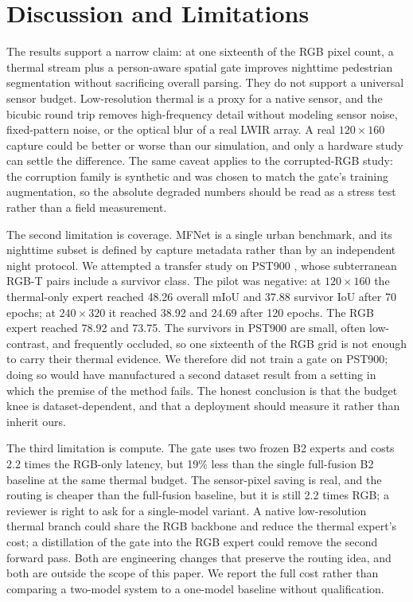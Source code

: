 \section{Discussion and Limitations}
\label{sec:discussion}

The results support a narrow claim: at one sixteenth of the RGB pixel count, a thermal
stream plus a person-aware spatial gate improves nighttime pedestrian segmentation
without sacrificing overall parsing. They do not support a universal sensor budget.
Low-resolution thermal is a proxy for a native sensor, and the bicubic round trip
removes high-frequency detail without modeling sensor noise, fixed-pattern noise, or
the optical blur of a real LWIR array. A real $120\times160$ capture could be better or
worse than our simulation, and only a hardware study can settle the difference. The
same caveat applies to the corrupted-RGB study: the corruption family is synthetic and
was chosen to match the gate's training augmentation, so the absolute degraded numbers
should be read as a stress test rather than a field measurement.

The second limitation is coverage. MFNet is a single urban benchmark, and its nighttime
subset is defined by capture metadata rather than by an independent night protocol. We
attempted a transfer study on PST900 \cite{shivakumar2019rgbthermal}, whose subterranean
RGB-T pairs include a survivor class. The pilot was negative: at $120\times160$ the
thermal-only expert reached 48.26 overall mIoU and 37.88 survivor IoU after 70
epochs; at $240\times320$ it reached 38.92 and 24.69 after 120 epochs. The RGB
expert reached 78.92 and 73.75. The survivors in PST900 are small, often low-contrast,
and frequently occluded, so one sixteenth of the RGB grid is not enough to carry their
thermal evidence. We therefore did not train a gate on PST900; doing so would have
manufactured a second dataset result from a setting in which the premise of the method
fails. The honest conclusion is that the budget knee is dataset-dependent, and that a
deployment should measure it rather than inherit ours.

The third limitation is compute. The gate uses two frozen B2 experts and costs 2.2
times the RGB-only latency, but 19\% less than the single full-fusion B2 baseline at the same thermal budget. The sensor-pixel saving is real, and the routing is cheaper than the full-fusion
baseline, but it is still 2.2 times RGB; a reviewer is right to ask for a single-model
variant. A native
low-resolution thermal branch could share the RGB backbone and reduce the thermal
expert's cost; a distillation of the gate into the RGB expert could remove the second
forward pass. Both are engineering changes that preserve the routing idea, and both are
outside the scope of this paper. We report the full cost rather than comparing a
two-model system to a one-model baseline without qualification.

